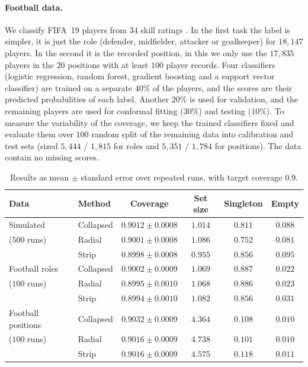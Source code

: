 \paragraph{Football data.} We classify FIFA~19 players from $34$ skill ratings \cite{fifa19data}. In the first task 
the label is simpler, it is just the role (defender, midfielder, attacker or goalkeeper) for $18{,}147$ players. In the 
second it is the recorded position, in this we only use the $17{,}835$ players in the $20$ positions with at least $100$ 
player records. Four classifiers (logistic regression, random forest, gradient boosting and a support vector classifier) 
are trained on a separate $40\%$ of the players, and the scores are their predicted probabilities of each label. Another
$20\%$ is used for validation, and the remaining players are used for conformal fitting ($30\%$) and testing ($10\%$). 
To measure the variability of the coverage, we keep the trained classifiers fixed and evaluate them over $100$ random split 
of the remaining data into calibration and test sets (sized $5{,}444$ / $1{,}815$ for roles and 
$5{,}351$ / $1{,}784$ for positions). The data contain no missing scores.

 
\begin{table}[ht]
\centering
\small
\begin{tabular}{llcccc}
\toprule
Data & Method & Coverage & Set size & Singleton & Empty \\
\midrule
Simulated & Collapsed & $0.9012\pm0.0008$ & $1.014$ & $0.811$ & $0.088$ \\
($500$ runs) & Radial & $0.9001\pm0.0008$ & $1.086$ & $0.752$ & $0.081$ \\
 & Strip & $0.8998\pm0.0008$ & $0.955$ & $0.856$ & $0.095$ \\
\midrule
Football roles & Collapsed & $0.9002\pm0.0009$ & $1.069$ & $0.887$ & $0.022$ \\
($100$ runs) & Radial & $0.8995\pm0.0010$ & $1.068$ & $0.886$ & $0.023$ \\
 & Strip & $0.8994\pm0.0010$ & $1.082$ & $0.856$ & $0.031$ \\
\midrule
Football positions & Collapsed & $0.9032\pm0.0009$ & $4.364$ & $0.108$ & $0.010$ \\
($100$ runs) & Radial & $0.9016\pm0.0009$ & $4.738$ & $0.101$ & $0.010$ \\
 & Strip & $0.9016\pm0.0009$ & $4.575$ & $0.118$ & $0.011$ \\
\bottomrule
\end{tabular}
\caption{Results as mean $\pm$ standard error over repeated runs, with target coverage $0.9$.}
\label{tab:results}
\end{table}

